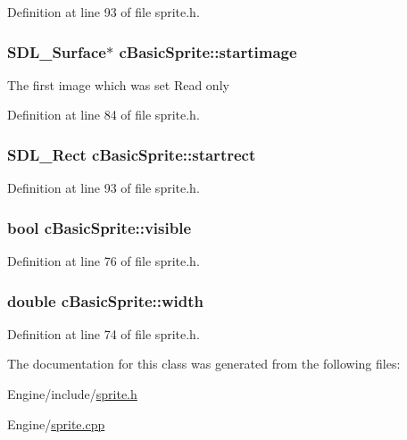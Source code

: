 Definition at line 93 of file sprite.\-h.

\hypertarget{classc_basic_sprite_abbe64a52b3e23c03246631e63382d1d5}{
\subsubsection[{startimage}]{\setlength{\rightskip}{0pt plus 5cm}S\-D\-L\-\_\-\-Surface$\ast$ c\-Basic\-Sprite\-::startimage}}\label{classc_basic_sprite_abbe64a52b3e23c03246631e63382d1d5}
The first image which was set Read only 

Definition at line 84 of file sprite.\-h.

\hypertarget{classc_basic_sprite_ad29c8fafc2c544c30cf028a58e93d063}{
\subsubsection[{startrect}]{\setlength{\rightskip}{0pt plus 5cm}S\-D\-L\-\_\-\-Rect c\-Basic\-Sprite\-::startrect}}\label{classc_basic_sprite_ad29c8fafc2c544c30cf028a58e93d063}


Definition at line 93 of file sprite.\-h.

\hypertarget{classc_basic_sprite_a1af0eebcb86cb160a384fb8acea2d773}{
\subsubsection[{visible}]{\setlength{\rightskip}{0pt plus 5cm}bool c\-Basic\-Sprite\-::visible}}\label{classc_basic_sprite_a1af0eebcb86cb160a384fb8acea2d773}


Definition at line 76 of file sprite.\-h.

\hypertarget{classc_basic_sprite_a99d40d0360fb5a3791c62240d65b677c}{
\subsubsection[{width}]{\setlength{\rightskip}{0pt plus 5cm}double c\-Basic\-Sprite\-::width}}\label{classc_basic_sprite_a99d40d0360fb5a3791c62240d65b677c}


Definition at line 74 of file sprite.\-h.



The documentation for this class was generated from the following files\-:\begin{DoxyCompactItemize}
\item 
Engine/include/\hyperlink{sprite_8h}{sprite.\-h}\item 
Engine/\hyperlink{sprite_8cpp}{sprite.\-cpp}\end{DoxyCompactItemize}
